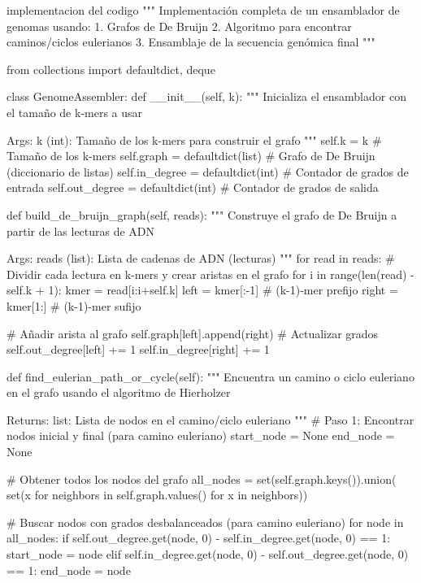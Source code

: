 \documentclass[fleqn,10pt]{article}
\begin{document}
implementacion del codigo 
"""
Implementación completa de un ensamblador de genomas usando:
1. Grafos de De Bruijn
2. Algoritmo para encontrar caminos/ciclos eulerianos
3. Ensamblaje de la secuencia genómica final
"""

from collections import defaultdict, deque

class GenomeAssembler:
    def __init__(self, k):
        """
        Inicializa el ensamblador con el tamaño de k-mers a usar
        
        Args:
            k (int): Tamaño de los k-mers para construir el grafo
        """
        self.k = k  # Tamaño de los k-mers
        self.graph = defaultdict(list)  # Grafo de De Bruijn (diccionario de listas)
        self.in_degree = defaultdict(int)  # Contador de grados de entrada
        self.out_degree = defaultdict(int)  # Contador de grados de salida

    def build_de_bruijn_graph(self, reads):
        """
        Construye el grafo de De Bruijn a partir de las lecturas de ADN
        
        Args:
            reads (list): Lista de cadenas de ADN (lecturas)
        """
        for read in reads:
            # Dividir cada lectura en k-mers y crear aristas en el grafo
            for i in range(len(read) - self.k + 1):
                kmer = read[i:i+self.k]
                left = kmer[:-1]  # (k-1)-mer prefijo
                right = kmer[1:]   # (k-1)-mer sufijo
                
                # Añadir arista al grafo
                self.graph[left].append(right)
                # Actualizar grados
                self.out_degree[left] += 1
                self.in_degree[right] += 1

    def find_eulerian_path_or_cycle(self):
        """
        Encuentra un camino o ciclo euleriano en el grafo usando el algoritmo de Hierholzer
        
        Returns:
            list: Lista de nodos en el camino/ciclo euleriano
        """
        # Paso 1: Encontrar nodos inicial y final (para camino euleriano)
        start_node = None
        end_node = None
        
        # Obtener todos los nodos del grafo
        all_nodes = set(self.graph.keys()).union(
            set(x for neighbors in self.graph.values() for x in neighbors))
        
        # Buscar nodos con grados desbalanceados (para camino euleriano)
        for node in all_nodes:
            if self.out_degree.get(node, 0) - self.in_degree.get(node, 0) == 1:
                start_node = node
            elif self.in_degree.get(node, 0) - self.out_degree.get(node, 0) == 1:
                end_node = node
        
\end{document}
